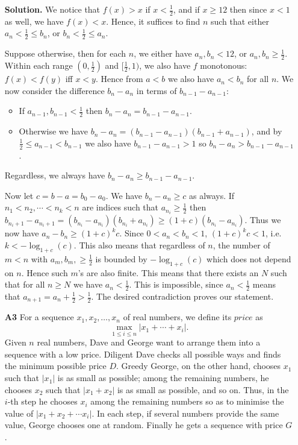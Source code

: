 \documentclass[11pt,a4paper]{article}
\begin{document}
\begin{enumerate}
	\textbf{Solution.} We notice that $f(x)>x$ if $x<\frac 12$, and if $x\ge 12$ then since $x<1$ as well, we have $f(x)<x$. Hence, it suffices to find $n$ such that either $a_n<\frac 12\le b_n$, or $b_n<\frac 12 \le a_n$. 
	
	Suppose otherwise, then for each $n$, we either have $a_n, b_n < 12$, or $a_n, b_n\ge\frac 12$. 
	Within each range $(0, \frac 12)$ and $[\frac 12, 1)$, we also have $f$ monotonous: $f(x)<f(y)$ iff $x<y$. 
	Hence from $a<b$ we also have $a_n<b_n$ for all $n$. We now consider the difference $b_n-a_n$ in terms of $b_{n-1}-a_{n-1}$: 
	\begin{itemize}
		\item If $a_{n-1}, b_{n-1}<\frac 12$ then $b_n-a_n=b_{n-1}-a_{n-1}$. 
		
		\item Otherwise we have $b_n-a_n = (b_{n-1}-a_{n-1})(b_{n-1}+a_{n-1})$, and by $\frac 12\le a_{n-1}<b_{n-1}$ we also have $b_{n-1}-a_{n-1}>1$ so $b_n-a_n>b_{n-1}-a_{n-1}$. 
	\end{itemize}
	Regardless, we always have $b_n-a_n \ge b_{n-1} - a_{n-1}$. 
	
	Now let $c=b-a=b_0-a_0$. We have $b_{n}-a_{n}\ge c$ as always. If $n_1< n_2, \cdots < n_k<n$ are indices such that $a_{n_i}\ge\frac 12$ then $b_{n_i+1}-a_{n_i+1} = (b_{n_i} - a_{n_i})(b_{n_i} + a_{n_i})\ge (1+c)(b_{n_i}-a_{n_i})$. Thus we now have $a_n-b_n\ge (1+c)^{k}c$. 
	Since $0< a_n<b_n<1$, $(1+c)^kc<1$, i.e. $k<-\log_{1+c}(c)$. 
	This also means that regardless of $n$, the number of $m<n$ with $a_m, b_m,\ge \frac 12$ is bounded by $-\log_{1+c}(c)$ which does not depend on $n$. Hence such $m$'s are also finite. 
	This means that there exists an $N$ such that for all $n\ge N$ we have $a_n<\frac 12$. This is impossible, since $a_n<\frac 12$ means that $a_{n+1}=a_n+\frac 12>\frac 12$. The desired contradiction proves our statement. 
	
	\item[\textbf{A3}] For a sequence $x_1,x_2,\ldots,x_n$ of real numbers, we define its $\textit{price}$ as \[\max_{1\le i\le n}|x_1+\cdots +x_i|.\] Given $n$ real numbers, Dave and George want to arrange them into a sequence with a low price. Diligent Dave checks all possible ways and finds the minimum possible price $D$. Greedy George, on the other hand, chooses $x_1$ such that $|x_1 |$ is as small as possible; among the remaining numbers, he chooses $x_2$ such that $|x_1 + x_2 |$ is as small as possible, and so on. Thus, in the $i$-th step he chooses $x_i$ among the remaining numbers so as to minimise the value of $|x_1 + x_2 + \cdots  x_i |$. In each step, if several numbers provide the same value, George chooses one at random. Finally he gets a sequence with price $G$.
	

\end{enumerate}
\end{document}
